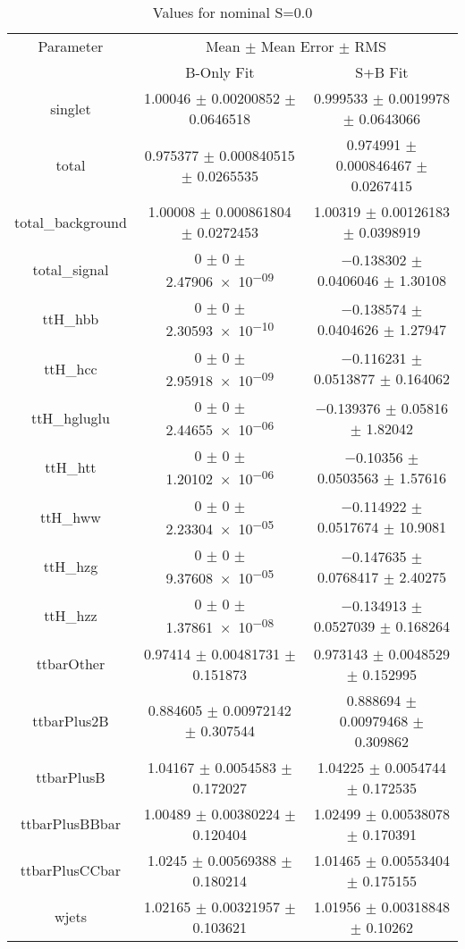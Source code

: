 \begin{table}
\centering
\caption{Values for nominal S=0.0}
\begin{tabular}{ccc}
\toprule
Parameter & \multicolumn{2}{c}{Mean $\pm$ Mean Error $\pm$ RMS}\\
 & B-Only Fit & S+B Fit\\
\midrule
singlet & \num{1.00046} $\pm$ \num{0.00200852} $\pm$ \num{0.0646518} & \num{0.999533} $\pm$ \num{0.0019978} $\pm$ \num{0.0643066}\\
total & \num{0.975377} $\pm$ \num{0.000840515} $\pm$ \num{0.0265535} & \num{0.974991} $\pm$ \num{0.000846467} $\pm$ \num{0.0267415}\\
total\_background & \num{1.00008} $\pm$ \num{0.000861804} $\pm$ \num{0.0272453} & \num{1.00319} $\pm$ \num{0.00126183} $\pm$ \num{0.0398919}\\
total\_signal & \num{0} $\pm$ \num{0} $\pm$ \num{2.47906e-09} & \num{-0.138302} $\pm$ \num{0.0406046} $\pm$ \num{1.30108}\\
ttH\_hbb & \num{0} $\pm$ \num{0} $\pm$ \num{2.30593e-10} & \num{-0.138574} $\pm$ \num{0.0404626} $\pm$ \num{1.27947}\\
ttH\_hcc & \num{0} $\pm$ \num{0} $\pm$ \num{2.95918e-09} & \num{-0.116231} $\pm$ \num{0.0513877} $\pm$ \num{0.164062}\\
ttH\_hgluglu & \num{0} $\pm$ \num{0} $\pm$ \num{2.44655e-06} & \num{-0.139376} $\pm$ \num{0.05816} $\pm$ \num{1.82042}\\
ttH\_htt & \num{0} $\pm$ \num{0} $\pm$ \num{1.20102e-06} & \num{-0.10356} $\pm$ \num{0.0503563} $\pm$ \num{1.57616}\\
ttH\_hww & \num{0} $\pm$ \num{0} $\pm$ \num{2.23304e-05} & \num{-0.114922} $\pm$ \num{0.0517674} $\pm$ \num{10.9081}\\
ttH\_hzg & \num{0} $\pm$ \num{0} $\pm$ \num{9.37608e-05} & \num{-0.147635} $\pm$ \num{0.0768417} $\pm$ \num{2.40275}\\
ttH\_hzz & \num{0} $\pm$ \num{0} $\pm$ \num{1.37861e-08} & \num{-0.134913} $\pm$ \num{0.0527039} $\pm$ \num{0.168264}\\
ttbarOther & \num{0.97414} $\pm$ \num{0.00481731} $\pm$ \num{0.151873} & \num{0.973143} $\pm$ \num{0.0048529} $\pm$ \num{0.152995}\\
ttbarPlus2B & \num{0.884605} $\pm$ \num{0.00972142} $\pm$ \num{0.307544} & \num{0.888694} $\pm$ \num{0.00979468} $\pm$ \num{0.309862}\\
ttbarPlusB & \num{1.04167} $\pm$ \num{0.0054583} $\pm$ \num{0.172027} & \num{1.04225} $\pm$ \num{0.0054744} $\pm$ \num{0.172535}\\
ttbarPlusBBbar & \num{1.00489} $\pm$ \num{0.00380224} $\pm$ \num{0.120404} & \num{1.02499} $\pm$ \num{0.00538078} $\pm$ \num{0.170391}\\
ttbarPlusCCbar & \num{1.0245} $\pm$ \num{0.00569388} $\pm$ \num{0.180214} & \num{1.01465} $\pm$ \num{0.00553404} $\pm$ \num{0.175155}\\
wjets & \num{1.02165} $\pm$ \num{0.00321957} $\pm$ \num{0.103621} & \num{1.01956} $\pm$ \num{0.00318848} $\pm$ \num{0.10262}\\
\bottomrule
\end{tabular}
\end{table}